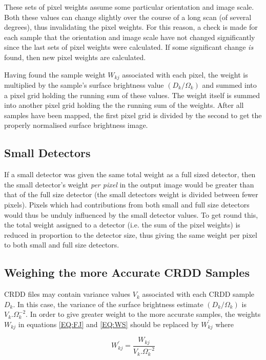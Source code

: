 These sets of pixel weights assume some particular orientation and image scale.
Both these values can change slightly over the course of a long scan (of 
several degrees), thus invalidating the pixel weights. For this reason, a check
is made for each sample that the orientation and image scale have not changed 
significantly since the last sets of pixel weights were calculated. If some 
significant change {\em is} found, then new pixel weights are calculated.

Having found the sample weight $W_{kj}$ associated with each pixel, the weight
is multiplied by the sample's surface brightness value $(D_{k}/\Omega_{k})$ and 
summed into a pixel grid holding the running sum of these values. The weight 
itself is summed into another pixel grid holding the the running sum of the 
weights. After all samples have been mapped, the first pixel grid is divided by 
the second to get the properly normalised surface brightness image.

\subsection{Small Detectors}
If a small detector was given the same total weight as a full sized detector,
then the small detector's weight {\em per pixel} in the output image would be
greater than that of the full size detector (the small detectors weight is
divided between fewer pixels). Pixels which had contributions from both small
and full size detectors would thus be unduly influenced by the small detector
values. To get round this, the total weight assigned to a detector (i.e. the sum
of the pixel weights) is reduced in proportion to the detector size, thus giving
the same weight per pixel to both small and full size detectors. 

\subsection{Weighing the more Accurate CRDD Samples}
\label {SEC:ACC}
CRDD files may contain variance values $V_{k}$ associated with each CRDD sample
$D_{k}$. In this case, the variance of the surface brightness estimate
$(D_{k}/\Omega_{k})$ is $V_{k}.\Omega_{k}^{-2}$. In order to give greater weight
to the more accurate samples, the weights $W_{kj}$ in equations \ref{EQ:FJ} and
\ref{EQ:WS} should be replaced by $W^{\prime}_{kj}$  where 

\begin{equation}
W^{\prime}_{kj}=\frac{W_{kj}}{V_{k}.\Omega_{k}^{-2}}
\label {EQ:WKJ}
\end{equation}

